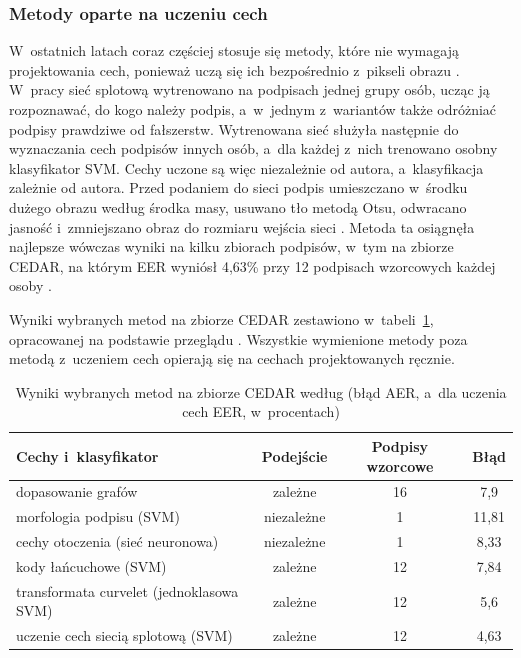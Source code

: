 \documentclass[12pt, twoside, openright]{article}
\begin{document}
\subsubsection*{Metody oparte na uczeniu cech}

W~ostatnich latach coraz częściej stosuje się metody, które nie wymagają projektowania cech, ponieważ uczą się ich bezpośrednio z~pikseli obrazu \cite{hafemann2017review}.
W~pracy \cite{hafemann2017features} sieć splotową wytrenowano na podpisach jednej grupy osób, ucząc ją rozpoznawać, do kogo należy podpis, a~w~jednym z~wariantów także odróżniać podpisy prawdziwe od fałszerstw.
Wytrenowana sieć służyła następnie do wyznaczania cech podpisów innych osób, a~dla każdej z~nich trenowano osobny klasyfikator SVM.
Cechy uczone są więc niezależnie od autora, a~klasyfikacja zależnie od autora.
Przed podaniem do sieci podpis umieszczano w~środku dużego obrazu według środka masy, usuwano tło metodą Otsu, odwracano jasność i~zmniejszano obraz do rozmiaru wejścia sieci \cite{hafemann2017features}.
Metoda ta osiągnęła najlepsze wówczas wyniki na kilku zbiorach podpisów, w~tym na zbiorze CEDAR, na którym EER wyniósł 4,63\% przy 12 podpisach wzorcowych każdej osoby \cite{hafemann2017features}.

Wyniki wybranych metod na zbiorze CEDAR zestawiono w~tabeli~\ref{Tab:cedar_literatura}, opracowanej na podstawie przeglądu \cite{hafemann2017review}.
Wszystkie wymienione metody poza metodą z~uczeniem cech opierają się na cechach projektowanych ręcznie.

\begin{table}[ht]
\caption{Wyniki wybranych metod na zbiorze CEDAR według \cite{hafemann2017review} (błąd AER, a~dla uczenia cech EER, w~procentach)}
\centering
	\begin{tabular}{|l|c|c|c|}
		\hline
		Cechy i~klasyfikator & Podejście & Podpisy wzorcowe & Błąd \\
		\hline
		dopasowanie grafów & zależne & 16 & 7,9 \\
		morfologia podpisu (SVM) & niezależne & 1 & 11,81 \\
		cechy otoczenia (sieć neuronowa) & niezależne & 1 & 8,33 \\
		kody łańcuchowe (SVM) & zależne & 12 & 7,84 \\
		transformata curvelet (jednoklasowa SVM) & zależne & 12 & 5,6 \\
		uczenie cech siecią splotową (SVM) & zależne & 12 & 4,63 \\
		\hline
	\end{tabular}
\label{Tab:cedar_literatura}
\end{table}
\end{document}
